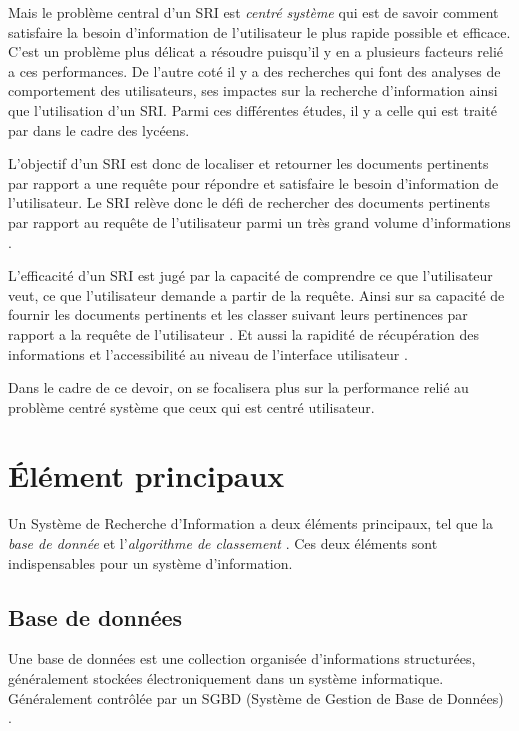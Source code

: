 Mais le problème central d'un SRI est \emph{centré système} qui est de savoir comment satisfaire la besoin d'information de l'utilisateur le plus rapide possible et efficace. C'est un problème plus délicat a résoudre puisqu'il y en a plusieurs facteurs relié a ces performances. De l'autre coté il y a des recherches qui font des analyses de comportement des utilisateurs, ses impactes sur la recherche d’information ainsi que l'utilisation d'un SRI\@. Parmi ces différentes études, il y a celle qui est traité par \citeauthor{ri-sur-le-web} \citep{ri-sur-le-web} dans le cadre des lycéens.

L'objectif d'un SRI est donc de localiser et retourner les documents pertinents par rapport a une requête pour répondre et satisfaire le besoin d'information de l'utilisateur. Le SRI relève donc le défi de rechercher des documents pertinents par rapport au requête de l'utilisateur parmi un très grand volume d'informations \citep{amelioration-ri-approche-semantique}.

L'efficacité d'un SRI est jugé par la capacité de comprendre ce que l'utilisateur veut, ce que l'utilisateur demande a partir de la requête. Ainsi sur sa capacité de fournir les documents pertinents et les classer suivant leurs pertinences par rapport a la requête de l'utilisateur \citep{vsm}. Et aussi la rapidité de récupération des informations et l'accessibilité au niveau de l'interface utilisateur \citep{ir-on-web}.

Dans le cadre de ce devoir, on se focalisera plus sur la performance relié au problème centré système que ceux qui est centré utilisateur.

\section{Élément principaux}
Un Système de Recherche d'Information a deux éléments principaux, tel que la \textit{base de donnée} et l'\textit{algorithme de classement} \citep{approche-semantique}. Ces deux éléments sont indispensables pour un système d'information.

\subsection{Base de données}
\begin{definition}
	Une base de données est une collection organisée d’informations structurées, généralement stockées
	électroniquement dans un système informatique. Généralement contrôlée par un SGBD (Système de Gestion de Base de Données) \citep{oracle-database}.
\end{definition}


